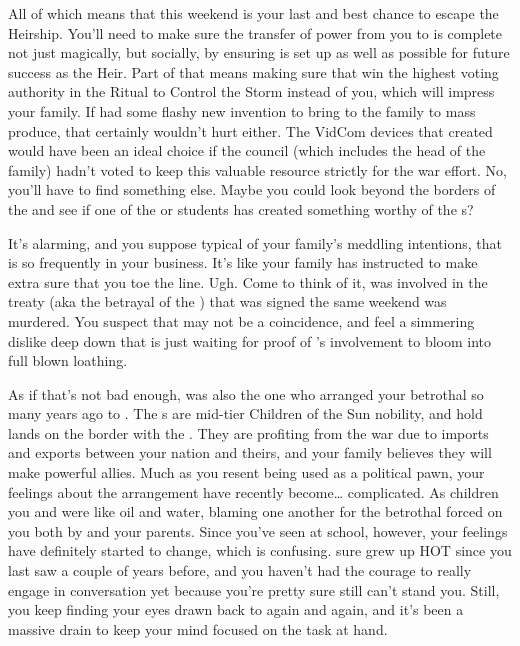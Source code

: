 \documentclass[char]{GL2020}
\begin{document}
All of which means that this weekend is your last and best chance to escape the Heirship. You'll need to make sure the transfer of power from you to \cAmbition{} is complete not just magically, but socially, by ensuring \cAmbition{\they} is set up as well as possible for future success as the Heir. Part of that means making sure that \cAmbition{\they} win\cAmbition{\plural} the highest voting authority in the Ritual to Control the Storm instead of you, which will impress your family. If \cAmbition{} had some flashy new invention to bring to the family to mass produce, that certainly wouldn't hurt either. The VidCom devices that \cTechStar{\full} created would have been an ideal choice if the council (which includes the head of the \cHeir{\formal} family) hadn't voted to keep this valuable resource strictly for the war effort. No, you'll have to find something else. Maybe you could look beyond the borders of the \pTech{} and see if one of the \pShippie{} or \pFarm{} students has created something worthy of the \cHeir{\formal}s?

It's alarming, and you suppose typical of your family's meddling intentions, that \cDiplomat{} is so frequently in your business. It's like your family has instructed \cDiplomat{\them} to make extra sure that you toe the line. Ugh. Come to think of it, \cDiplomat{} was involved in the treaty (aka the betrayal of the \pShippies{}) that was signed the same weekend \cHeirSibling{} was murdered. You suspect that may not be a coincidence, and feel a simmering dislike deep down that is just waiting for proof of \cDiplomat{}'s involvement to bloom into full blown loathing. 

As if that's not bad enough, \cDiplomat{} was also the one who arranged your betrothal so many years ago to \cChupStudent{\full}. The \cChupStudent{\formal}s are mid-tier Children of the Sun nobility, and hold lands on the border with the \pTech{}. They are profiting from the war due to imports and exports between your nation and theirs, and your family believes they will make powerful allies. Much as you resent being used as a political pawn, your feelings about the arrangement have recently become\ldots{} complicated. As children you and \cChupStudent{} were like oil and water, blaming one another for the betrothal forced on you both by \cDiplomat{} and your parents. Since you've seen \cChupStudent{\them} at school, however, your feelings have definitely started to change, which is confusing. \cChupStudent{} sure grew up HOT since you last saw \cChupStudent{\them} a couple of years before, and you haven't had the courage to really engage \cChupStudent{\them} in conversation yet because you're pretty sure \cChupStudent{\they} still can't stand you. Still, you keep finding your eyes drawn back to \cChupStudent{\them} again and again, and it's been a massive drain to keep your mind focused on the task at hand. 
\end{document}
